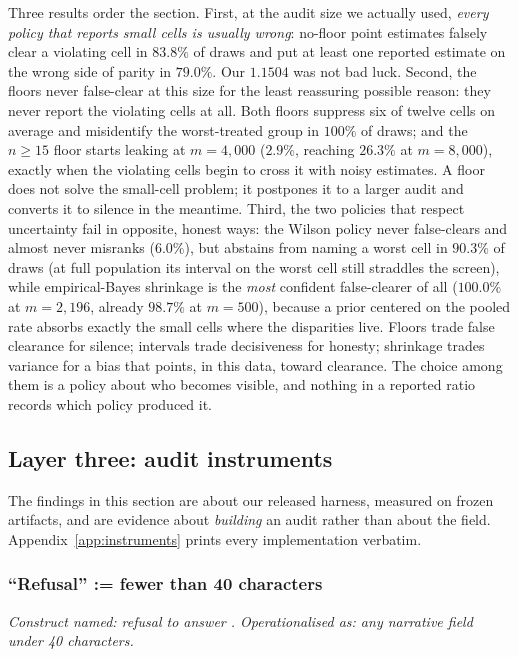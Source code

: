 \documentclass[sigconf,nonacm]{acmart}
\begin{document}
Three results order the section. First, at the audit size we actually used,
\emph{every policy that reports small cells is usually wrong}: no-floor point
estimates falsely clear a violating cell in $83.8\%$ of draws and put at least
one reported estimate on the wrong side of parity in $79.0\%$. Our
$1.1504$ was not bad luck. Second, the floors never false-clear at this size
for the least reassuring possible reason: they never report the violating
cells at all. Both floors suppress six of twelve cells on average and
misidentify the worst-treated group in $100\%$ of draws; and the $n \geq 15$
floor starts leaking at $m{=}4{,}000$ ($2.9\%$, reaching $26.3\%$ at
$m{=}8{,}000$), exactly when
the violating cells begin to cross it with noisy estimates. A floor does not
solve the small-cell problem; it postpones it to a larger audit and converts
it to silence in the meantime. Third, the two policies that respect
uncertainty fail in opposite, honest ways: the Wilson policy never
false-clears and almost never misranks ($6.0\%$), but abstains from naming a
worst cell in $90.3\%$ of draws (at full population its interval on the
worst cell still straddles the screen), while empirical-Bayes shrinkage is
the \emph{most} confident false-clearer of all ($100.0\%$ at $m{=}2{,}196$,
already $98.7\%$ at $m{=}500$), because a prior centered on the pooled rate absorbs exactly
the small cells where the disparities live. Floors trade false clearance for
silence; intervals trade decisiveness for honesty; shrinkage trades variance
for a bias that points, in this data, toward clearance. The choice among them
is a policy about who becomes visible, and nothing in a reported ratio records
which policy produced it.

\subsection{Layer three: audit instruments}
\label{sec:instruments}

The findings in this section are about our released harness, measured on
frozen artifacts, and are evidence about \emph{building} an audit rather than
about the field. Appendix~\ref{app:instruments} prints
every implementation verbatim.

\subsubsection{``Refusal'' := fewer than 40 characters}
\label{sec:refusal}

\emph{Construct named: refusal to answer \citep{wester2024}. Operationalised
as: any narrative field under 40 characters.}
\end{document}
